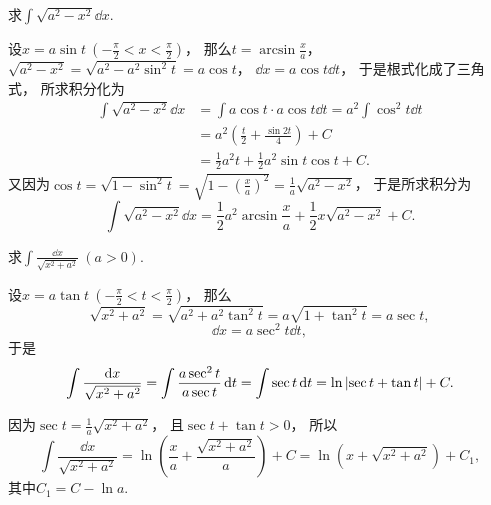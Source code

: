 \begin{example}
求\(\int \sqrt{a^2 - x^2} \dd{x}\).
\begin{solution}
设\(x = a \sin t\ (-\frac{\pi}{2} < x < \frac{\pi}{2})\)，
那么\(t = \arcsin\frac{x}{a}\)，
\(\sqrt{a^2 - x^2} = \sqrt{a^2 - a^2 \sin^2 t} = a \cos t\)，
\(\dd{x} = a \cos t \dd{t}\)，
于是根式化成了三角式，
所求积分化为\begin{align*}
	\int \sqrt{a^2 - x^2} \dd{x}
	&= \int a \cos t \cdot a \cos t \dd{t}
	= a^2 \int \cos^2 t \dd{t} \\
	&= a^2 \left( \frac{t}{2} + \frac{\sin 2t}{4} \right) + C \\
	&= \frac{1}{2} a^2 t + \frac{1}{2} a^2 \sin t \cos t + C.
\end{align*}
又因为\(\cos t = \sqrt{1 - \sin^2 t}
= \sqrt{1 - \left(\frac{x}{a}\right)^2}
= \frac{1}{a} \sqrt{a^2 - x^2}\)，
于是所求积分为\[
	\int \sqrt{a^2 - x^2} \dd{x}
	= \frac{1}{2} a^2 \arcsin\frac{x}{a} + \frac{1}{2} x \sqrt{a^2 - x^2} + C.
\]
\end{solution}
\end{example}

\begin{example}
求\(\int \frac{\dd{x}}{\sqrt{x^2 + a^2}}\ (a>0)\).
\begin{solution}
设\(x = a \tan t\ (-\frac{\pi}{2} < t < \frac{\pi}{2})\)，
那么\[
	\sqrt{x^2 + a^2}
	= \sqrt{a^2 + a^2 \tan^2 t}
	= a \sqrt{1 + \tan^2 t}
	= a \sec t,
\]\[
	\dd{x} = a \sec^2 t \dd{t},
\]
于是\[
	\int \frac{\dd{x}}{\sqrt{x^2 + a^2}}
	= \int \frac{a \sec^2 t}{a \sec t} \dd{t}
	= \int \sec t \dd{t}
	= \ln\abs{\sec t + \tan t} + C.
\]

因为\(\sec t = \frac{1}{a} \sqrt{x^2 + a^2}\)，
且\(\sec t + \tan t > 0\)，
所以\[
	\int \frac{\dd{x}}{\sqrt{x^2 + a^2}}
	= \ln( \frac{x}{a} + \frac{\sqrt{x^2 + a^2}}{a} ) + C
	= \ln(x + \sqrt{x^2 + a^2}) + C_1,
\]
其中\(C_1 = C - \ln a\).
\end{solution}
\end{example}

